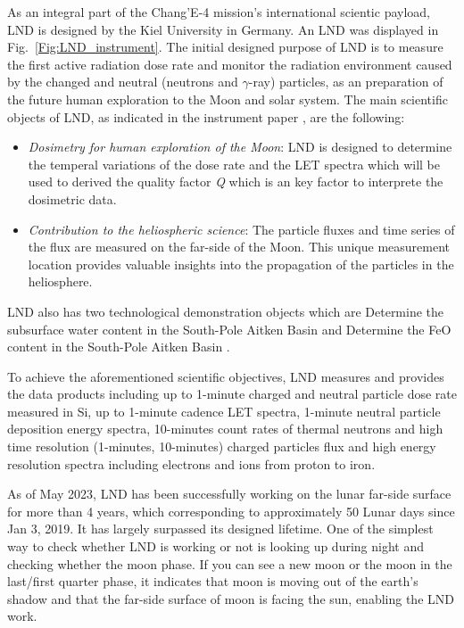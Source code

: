 As an integral part of the Chang'E-4 mission's international scientic payload, \ac{LND} is designed by the Kiel University in Germany. An \ac{LND} was displayed in Fig.~\ref{Fig:LND_instrument}. The initial designed purpose of \ac{LND} is to measure the first active radiation dose rate and monitor the radiation environment caused by the changed and neutral (neutrons and $\gamma$-ray) particles, as an preparation of the future human exploration to the Moon and solar system. 
The main scientific objects of LND, as indicated in the instrument paper \citep{Wimmer-2020-LND}, are the following:
\begin{itemize}
    \item \emph{Dosimetry for human exploration of the Moon}: LND is designed to determine the temperal variations of the dose rate and the LET spectra which will be used to derived the quality factor \textit{Q} which is an key factor to interprete the dosimetric data.
    \item \emph{Contribution to the heliospheric science}: The particle fluxes and time series of the flux are measured on the far-side of the Moon. This unique measurement location provides valuable insights into the propagation of the particles in the heliosphere.
\end{itemize}
\ac{LND} also has two technological demonstration objects which are Determine the subsurface water content in the South-Pole Aitken Basin and Determine the FeO content in the South-Pole Aitken Basin \citep{Wimmer-2020-LND}.

To achieve the aforementioned scientific objectives, LND measures and provides the data products including up to 1-minute charged and neutral particle dose rate measured in Si, up to 1-minute cadence \ac{LET} spectra, 1-minute neutral particle deposition energy spectra, 10-minutes count rates of thermal neutrons and high time resolution (1-minutes, 10-minutes) charged particles flux and high energy resolution spectra including electrons and ions from proton to iron.

As of May 2023, LND has been successfully working on the lunar far-side surface for more than 4 years, which corresponding to approximately 50 Lunar days since Jan 3, 2019. It has largely surpassed its designed lifetime.
One of the simplest way to check whether LND is working or not is looking up during night and checking whether the moon phase. If you can see a new moon or the moon in the last/first quarter phase, it indicates that moon is moving out of the earth's shadow and that the far-side surface of moon is facing the sun, enabling the \ac{LND} work.

